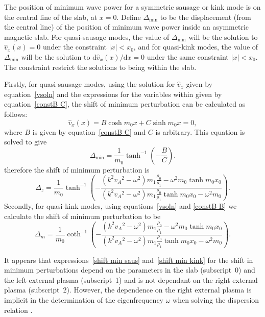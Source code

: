 \documentclass[namedreferences]{solarphysics}
\numberwithin{equation}{section}
\begin{document}
\begin{article}
The position of minimum wave power for a symmetric sausage or kink mode is on the central line of the slab, at $x=0$. Define $\Delta_\textrm{min}$ to be the displacement (from the central line) of the position of minimum wave power inside an asymmetric magnetic slab. For quasi-sausage modes, the value of $\Delta_\textrm{min}$ will be the solution to $\widehat{v}_x(x) = 0$ under the constraint $|x| < x_0$, and for quasi-kink modes, the value of $\Delta_\textrm{min}$ will be the solution to $\textrm{d}\widehat{v}_x (x) / \textrm{d}x = 0$ under the same constraint $|x| < x_0$. The constraint restrict the solutions to being within the slab. 

Firstly, for quasi-sausage modes, using the solution for $\widehat{v}_x$ given by equation~\eqref{vsoln} and the expressions for the variables within given by equation~\eqref{constB C}, the shift of minimum perturbation can be calculated as follows:
\begin{equation}
\widehat{v}_x(x) = B\cosh{m_0x}+C\sinh{m_0x} = 0,
\end{equation}
where $B$ is given by equation~\eqref{constB C} and $C$ is arbitrary. This equation is solved to give
\begin{equation}
\Delta_\textrm{min} = \frac{1}{m_0} \tanh^{-1}\left(-\frac{B}{C}\right). \label{disp of min power saus}
\end{equation}
therefore the shift of minimum perturbation is
\begin{equation}
\Delta_z = \frac{1}{m_0}\tanh^{-1}\left(-\frac{(k^2{v_A}^2-\omega^2)m_1\frac{\rho_0}{\rho_1} - \omega^2{m_0}\tanh{m_0x_0}}{(k^2{v_A}^2-\omega^2)m_1\frac{\rho_0}{\rho_1}\tanh{m_0x_0} - \omega^2{m_0}}\right). \label{shift min saus}
\end{equation}
Secondly, for quasi-kink modes, using equations~\eqref{vsoln} and \eqref{constB B} we calculate the shift of minimum perturbation to be
\begin{equation}
\Delta_m = \frac{1}{m_0}\coth^{-1}\left(-\frac{(k^2{v_A}^2-\omega^2)m_1\frac{\rho_0}{\rho_1} - \omega^2{m_0}\tanh{m_0x_0}}{(k^2{v_A}^2-\omega^2)m_1\frac{\rho_0}{\rho_1}\tanh{m_0x_0} - \omega^2{m_0}}\right). \label{shift min kink}
\end{equation}

It appears that expressions~\eqref{shift min saus} and~\eqref{shift min kink} for the shift in minimum perturbations depend on the parameters in the slab (subscript~0) and the left external plasma (subscript~1) and is not dependant on the right external plasma (subscript~2). However, the dependence on the right external plasma is implicit in the determination of the eigenfrequency $\omega$ when solving the dispersion relation \citep{all_etal17}.



\end{article}
\end{document}
